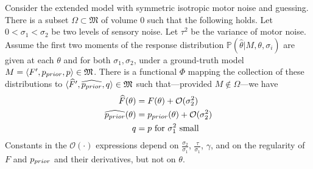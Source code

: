 \begin{thm}\label{thm:restated-thms3-4}
Consider the extended model with symmetric isotropic motor noise and guessing.
There is a subset $\Omega \subset \mathfrak{M}$ of volume $0$ such that the following holds.
Let $0 < \sigma_1 < \sigma_2$ be two levels of sensory noise. Let $\tau^2$ be the variance of motor noise.
Assume the first two moments of the response distribution $\mathbb{P}(\widehat{\theta}|M,\theta, \sigma_i)$ are given at each $\theta$ and for both $\sigma_1, \sigma_2$, under a ground-truth model $M = \langle F', p_{prior},p \rangle \in \mathfrak{M}$.
There is a functional $\Phi$ mapping the collection of these distributions to $\langle \widehat{F}', \widehat{p_{prior}},q \rangle \in \mathfrak{M}$
such that---provided $M \not\in \Omega$---we have
\begin{align*}
    \widehat{F}(\theta) &= F(\theta) + \mathcal{O}(\sigma_2^2) \\
    \widehat{p_{prior}}(\theta) &= p_{prior}(\theta) + \mathcal{O}(\sigma_2^2) \\
    q &= p  \text{ for $\sigma_1^2$ small}
\end{align*}
Constants in the $\mathcal{O}(\cdot)$ expressions depend on $\frac{\sigma_2}{\sigma_1}$, $\frac{\tau}{\sigma_1}$, $\gamma$, and on the regularity of $F$ and $p_{prior}$ and their derivatives, but not on $\theta$.
\end{thm}



